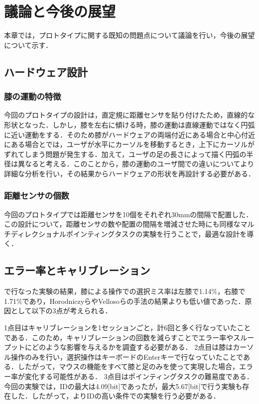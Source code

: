 \chapter{議論と今後の展望}
本章では，プロトタイプに関する既知の問題点について議論を行い，今後の展望について示す．
\section{ハードウェア設計}
\subsection{膝の運動の特徴}
今回のプロトタイプの設計は，直定規に距離センサを貼り付けたため，直線的な形状となった．しかし，膝を左右に傾ける時，膝の運動は直線運動ではなく円弧に近い運動をする．そのため膝がハードウェアの両端付近にある場合と中心付近にある場合とでは，ユーザが水平にカーソルを移動するとき，上下にカーソルがずれてしまう問題が発生する．加えて，ユーザの足の長さによって描く円弧の半径は異なると考える．このことから，膝の運動のユーザ間での違いについてより詳細な分析を行い，その結果からハードウェアの形状を再設計する必要がある．

\subsection{距離センサの個数}
今回のプロトタイプでは距離センサを10個をそれぞれ30\si{mm}の間隔で配置した．この設計について，距離センサの数や配置の間隔を増減させた時にも同様なマルチディレクショナルポインティングタスクの実験を行うことで，最適な設計を導く．

\section{エラー率とキャリブレーション}
で行なった実験の結果，膝による操作での選択ミス率は左膝で1.14\%，右膝で1.71\%であり，Horodniczyら\cite{Horodniczy:2017:FHE:3025453.3025625}やVellosoら\cite{velloso:hal-01599657}の手法の結果よりも低い値であった．原因として以下の3点が考えられる．

1点目はキャリブレーションを1セッションごと，計6回と多く行なっていたことである．このため，キャリブレーションの回数を減らすことでエラー率やスループットにどのような影響を与えるかを調査する必要がある．
2点目は膝はカーソル操作のみを行い，選択操作はキーボードのEnterキーで行なっていたことである．したがって，マウスの機能をすべて膝と足のみを使って実現した場合，エラー率が変化する可能性がある．
3点目はポインティングタスクの難易度である．今回の実験では，IDの最大は4.09[bit]であったが，最大5.67[bit]で行う実験も存在した\cite{Horodniczy:2017:FHE:3025453.3025625, velloso:hal-01599657}．したがって，よりIDの高い条件での実験を行う必要がある．

